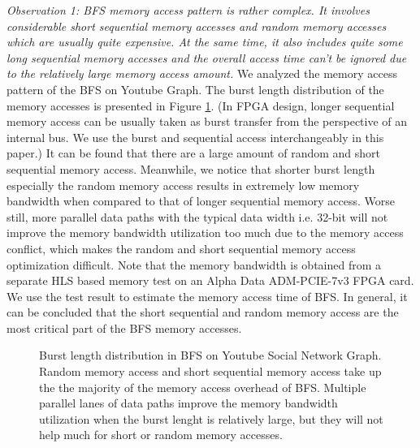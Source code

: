 \textit{Observation 1: BFS memory access pattern is rather complex. 
It involves considerable short sequential memory accesses 
and random memory accesses which are usually quite 
expensive. At the same time, it also includes quite some long 
sequential memory accesses and the overall access time can't be 
ignored due to the relatively large memory access amount.} We analyzed the 
memory access pattern of the BFS on Youtube Graph. The burst length distribution 
of the memory accesses is presented in Figure \ref{fig:burst-len-youtube}. 
(In FPGA design, longer sequential memory access can be usually taken as burst 
transfer from the perspective of an internal bus. We use 
the burst and sequential access interchangeably in this paper.)
It can be found that there are a large amount of random and short sequential 
memory access. Meanwhile, we notice that shorter burst length especially 
the random memory access results in extremely low memory bandwidth 
when compared to that of longer sequential memory access. Worse still, 
more parallel data paths with the typical data width i.e. 32-bit will 
not improve the memory bandwidth utilization too much due to the memory 
access conflict, which makes the random and short sequential 
memory access optimization difficult. Note that the memory bandwidth is obtained 
from a separate HLS based memory test on an Alpha Data ADM-PCIE-7v3 FPGA card.
We use the test result to estimate the memory access time of BFS. 
In general, it can be concluded that the short sequential and random 
memory access are the most critical part of the BFS memory accesses. 
 
\begin{figure}
\caption{Burst length distribution in BFS on Youtube Social Network Graph. 
    Random memory access and short sequential memory access take up the 
    the majority of the memory access overhead of BFS. Multiple parallel 
    lanes of data paths improve the memory bandwidth utilization when the 
    burst lenght is relatively large, but they will not help much 
    for short or random memory accesses.}
\label{fig:burst-len-youtube}
\end{figure}

